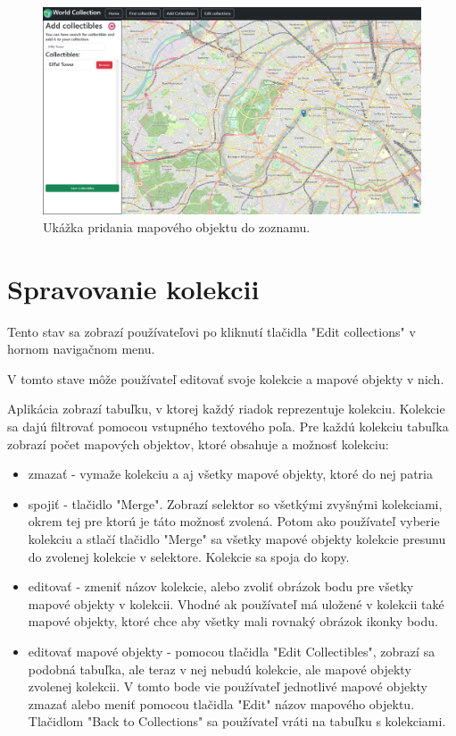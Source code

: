 \begin{figure}[h]
      \includegraphics[width=140mm]{../img/ud-pridanie.png}
      \centering
      \caption{Ukážka pridania mapového objektu do zoznamu. }
\end{figure}

\section{Spravovanie kolekcii }

Tento stav sa zobrazí používateľovi po kliknutí tlačidla "Edit collections" v hornom navigačnom menu.

V tomto stave môže používateľ editovať svoje kolekcie a mapové objekty v nich.

Aplikácia zobrazí tabuľku, v ktorej každý riadok reprezentuje kolekciu. Kolekcie sa dajú filtrovať pomocou vstupného textového poľa.
Pre každú kolekciu tabuľka zobrazí počet mapových objektov, ktoré obsahuje a možnosť kolekciu:
\begin{itemize}
      \item zmazať - vymaže kolekciu a aj všetky mapové objekty, ktoré do nej patria
      \item spojiť - tlačidlo "Merge". Zobrazí selektor so všetkými zvyšnými kolekciami, okrem tej pre ktorú je táto možnosť zvolená. Potom ako používateľ vyberie kolekciu a stlačí tlačidlo "Merge" sa
            všetky mapové objekty kolekcie presunu do zvolenej kolekcie v selektore. Kolekcie sa spoja do kopy.
      \item editovať - zmeniť názov kolekcie, alebo zvoliť obrázok bodu pre všetky mapové objekty v kolekcii. Vhodné ak používateľ má uložené v kolekcii také mapové objekty, ktoré chce aby všetky mali rovnaký obrázok ikonky bodu.
      \item editovať mapové objekty - pomocou tlačidla "Edit Collectibles", zobrazí sa podobná tabuľka, ale teraz v nej nebudú kolekcie, ale mapové objekty zvolenej kolekcii. V tomto bode vie používateľ
            jednotlivé mapové objekty zmazať alebo meniť pomocou tlačidla "Edit" názov mapového objektu. Tlačidlom "Back to Collections" sa používateľ vráti na tabuľku s kolekciami.
\end{itemize}

